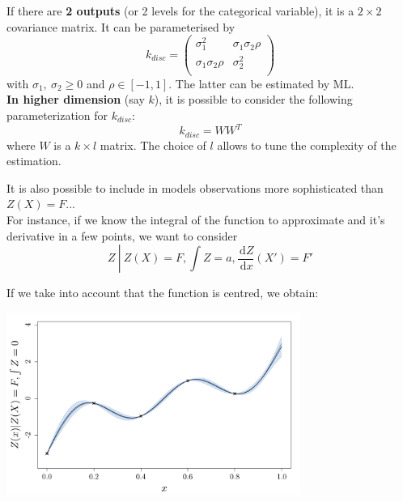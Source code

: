 \documentclass{beamer}
\newcommand\dx{\, \mathrm{d}}
\begin{document}
\begin{frame}{}
If there are \textbf{2 outputs} (or 2 levels for the categorical variable), it is a $2 \times 2$ covariance matrix. It can be parameterised by
\small
$$k_{disc} = 
\begin{pmatrix}
	\sigma_1^2 & \sigma_1 \sigma_2 \rho \\
	\sigma_1 \sigma_2 \rho & \sigma_2^2 \\
\end{pmatrix}$$
\normalsize
with  $\sigma_1,\ \sigma_2 \geq 0$ and $\rho \in [-1,1]$. The latter can be estimated by ML.\\
\vspace{5mm}
\textbf{In higher dimension} (say $k$), it is possible to consider the following parameterization for $k_{disc}$:
\small
$$k_{disc} = W W^T$$
\normalsize
where $W$ is a $k \times l$ matrix. The choice of $l$ allows to tune the complexity of the estimation.

\end{frame}

\begin{frame}{}
It is also possible to include in models observations more sophisticated than $Z(X)=F$... \\
\vspace{5mm}
For instance, if we know the integral of the function to approximate and it's derivative in a few points, we want to consider
$$ Z \ \left| \ Z(X) = F, \int Z = a, \frac{\dx Z}{\dx x}(X')= F' \right. $$
\end{frame}

\begin{frame}{}
\begin{example}
	If we take into account that the function is centred, we obtain:
	\begin{center}
	\includegraphics[height=6cm]{figures/R/exotic_int}
	\end{center}
\end{example}
\end{frame}
\end{document}
